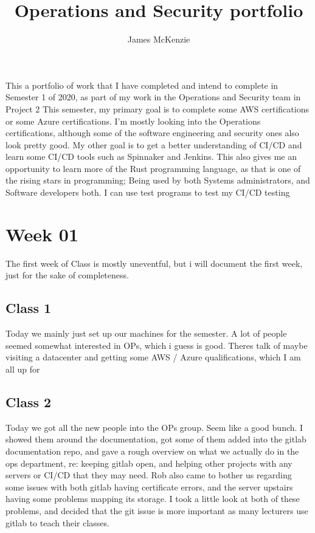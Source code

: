 \documentclass{article}
\begin{document}
\title{Operations and Security portfolio}
\author{James McKenzie}

\maketitle
This a portfolio of work that I have completed and intend to complete in Semester 1 of 2020, as part of my work in the 
Operations and Security team in Project 2
\medskip
This semester, my primary goal is to complete some AWS certifications or some Azure certifications. I'm mostly looking into the 
Operations certifications, although some of the software engineering and security ones also look pretty good. My other goal
is to get a better understanding of CI/CD and learn some CI/CD tools such as Spinnaker and Jenkins. This also gives me an opportunity
to learn more of the Rust programming language, as that is one of the rising stars in programming; Being used by both Systems administrators,
and Software developers both. I can use test programs to test my CI/CD testing


\section{Week 01}
The first week of Class is mostly uneventful, but i will document the first week,  just for the sake of completeness. 


\subsection{Class 1}

Today we mainly just set up our machines for the semester. A lot of people seemed somewhat interested in OPs, which i guess is good.
Theres talk of maybe visiting a datacenter and getting some AWS / Azure qualifications, which I am all up for

\subsection{Class 2}
Today we got all the new people into the OPs group. Seem like a good bunch. I showed them around the documentation, got some of them added
into the gitlab documentation repo, and gave a rough overview on what we actually do in the ops department, re: keeping gitlab open, and helping
other projects with any servers or CI/CD that they may need. Rob also came to bother us regarding some issues with both gitlab having certificate
errors, and the server upstairs having some problems mapping its storage. I took a little look at both of these problems, and decided that 
the git issue is more important as many lecturers use gitlab to teach their classes.
\end{document}
